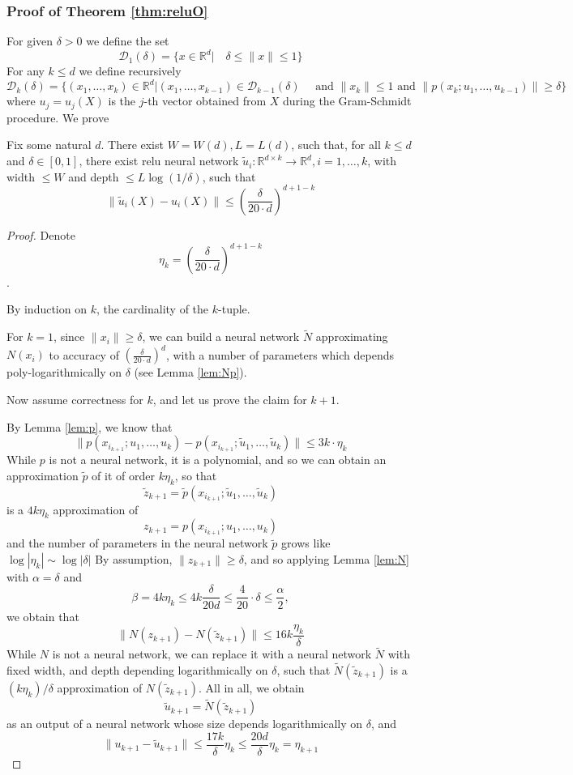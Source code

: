 \documentclass[twoside,11pt]{article}
\newcommand{\RR}{\mathbb{R}}
\begin{document}
\subsubsection{Proof of Theorem \ref{thm:reluO}}
For given $\delta>0$  we define the set 
$$\mathcal{D}_1(\delta)=\{x\in \RR^d| \quad \delta\leq \|x\|\leq 1  \} $$
For any $k\leq d$ we define recursively
$$\mathcal{D}_{k}(\delta)=\{(x_1,\ldots,x_k)\in \RR^d| (x_1,\ldots,x_{k-1})\in \mathcal{D}_{k-1}(\delta) \quad \text{ and } \|x_k\| \leq 1   \text{ and } \|p(x_k;u_1,\ldots,u_{k-1})\|\geq \delta  \}  $$
where $u_j=u_j(X)$ is the $j$-th vector obtained from $X$ during the Gram-Schmidt procedure. We prove
\begin{lem}\label{lem:u}
Fix some natural $d$.
There exist $W=W(d),L=L(d)$, such that, 
for all $k\leq d$ and  $\delta\in [0,1]$, there exist relu neural network $\tilde{u}_i:\RR^{d\times k}\to \RR^d, i=1,\ldots,k $,  with width $\leq W$ and depth $\leq L\log(1/\delta)$, such that  
$$\|\tilde{u}_i(X)-u_i(X)\|\leq \left(\frac{\delta}{20\cdot d} \right)^{d+1-k} $$
\end{lem}
\begin{proof}
Denote 
$$\eta_k=\left(\frac{\delta}{20\cdot d} \right)^{d+1-k} $$.

By induction on $k$, the cardinality of the $k$-tuple. 

For $k=1$, since $\|x_i\|\geq \delta$, we can build a neural network $\tilde N$ approximating $N(x_i)$ to accuracy of $\left(\frac{\delta}{20\cdot d} \right)^{d} $, with a number of parameters which depends poly-logarithmically on $\delta$ (see Lemma \ref{lem:Np}).  

Now assume correctness for $k$, and let us prove the claim for $k+1$. 

By Lemma \ref{lem:p}, we know that 
$$\|p(x_{i_{k+1}};u_{1},\ldots,u_{k})-p(x_{i_{k+1}};\tilde{u}_{1},\ldots,\tilde{u}_{k})\| \leq 3k \cdot \eta_k $$
While $p$ is not a neural network, it is a polynomial, and so we can obtain an approximation $\tilde p$ of it of order $k \eta_k$, so that 
$$\tilde z_{k+1}= \tilde p(x_{i_{k+1}};\tilde{u}_{1},\ldots,\tilde{u}_{k})$$
is a $4k\eta_k$ approximation of 
$$z_{k+1}= p(x_{i_{k+1}};u_{1},\ldots,u_{k})$$
and the number of parameters in the neural network $\tilde p$ grows like  $\log |\eta_k |\sim \log |\delta| $ 
By assumption, $\|z_{k+1}\| \geq \delta$, and so applying Lemma \ref{lem:N} with $\alpha=\delta$ and 
$$\beta=4k\eta_k\leq 4k \frac{\delta}{20d} \leq  \frac{4}{20}\cdot \delta \leq \frac{\alpha}{2}, $$
we obtain that 
$$\|N(z_{k+1})-N(\tilde{z}_{k+1})\| \leq 16k \frac{\eta_k}{\delta} $$
While $N$ is not a neural network, we can replace it with a neural network $\tilde N$ with fixed width, and depth depending logarithmically on $\delta$, such that $\tilde N(\tilde z_{k+1})$ is a $(k \eta_k)/\delta$ approximation of $N(\tilde z_{k+1}) $. All in all, we obtain 
$$\tilde u_{k+1}=\tilde N(\tilde z_{k+1}) $$
as an output of a neural network whose size depends logarithmically on $\delta$, and 
$$\|u_{k+1}-\tilde{u}_{k+1}\|\leq \frac{17k}{\delta} \eta_k \leq \frac{20 d}{\delta}\eta_k=\eta_{k+1}$$
\end{proof}
\end{document}
